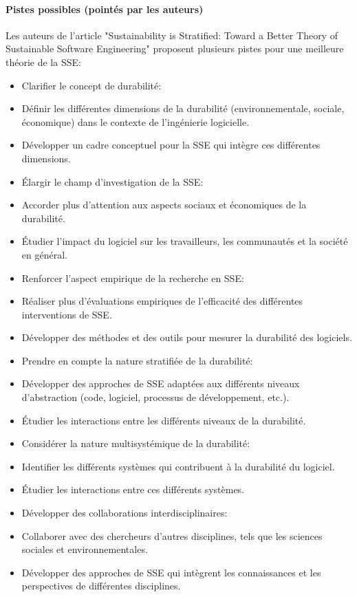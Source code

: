 \paragraph{Pistes possibles (pointés par les auteurs)}
Les auteurs de l'article "Sustainability is Stratified: Toward a Better Theory of Sustainable Software Engineering" proposent plusieurs pistes pour une meilleure théorie de la SSE:
\begin{itemize}
    \item Clarifier le concept de durabilité:
        \item Définir les différentes dimensions de la durabilité (environnementale, sociale, économique) dans le contexte de l'ingénierie logicielle.
        \item Développer un cadre conceptuel pour la SSE qui intègre ces différentes dimensions.
    \item Élargir le champ d'investigation de la SSE:
        \item Accorder plus d'attention aux aspects sociaux et économiques de la durabilité.
        \item Étudier l'impact du logiciel sur les travailleurs, les communautés et la société en général.
    \item Renforcer l'aspect empirique de la recherche en SSE:
        \item Réaliser plus d'évaluations empiriques de l'efficacité des différentes interventions de SSE.
        \item Développer des méthodes et des outils pour mesurer la durabilité des logiciels.
    \item Prendre en compte la nature stratifiée de la durabilité:
        \item Développer des approches de SSE adaptées aux différents niveaux d'abstraction (code, logiciel, processus de développement, etc.).
        \item Étudier les interactions entre les différents niveaux de la durabilité.
    \item Considérer la nature multisystémique de la durabilité:
        \item Identifier les différents systèmes qui contribuent à la durabilité du logiciel.
        \item Étudier les interactions entre ces différents systèmes.
    \item Développer des collaborations interdisciplinaires:
        \item Collaborer avec des chercheurs d'autres disciplines, tels que les sciences sociales et environnementales.
        \item Développer des approches de SSE qui intègrent les connaissances et les perspectives de différentes disciplines.
\end{itemize}

